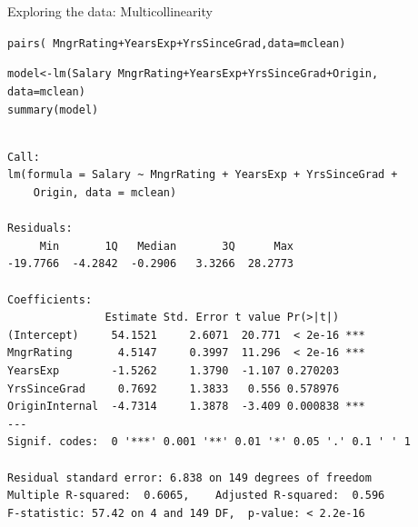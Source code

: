 \documentclass{beamer}\usepackage[]{graphicx}\usepackage[]{color}
\makeatletter
\newcommand{\hlopt}[1]{\textcolor[rgb]{1,0.894,0.769}{#1}}%
\newcommand{\hlstd}[1]{\textcolor[rgb]{1,0.894,0.769}{#1}}%
\newcommand{\hlkwb}[1]{\textcolor[rgb]{0.804,0.776,0.451}{#1}}%
\newcommand{\hlkwc}[1]{\textcolor[rgb]{0.78,0.941,0.545}{#1}}%
\newcommand{\hlkwd}[1]{\textcolor[rgb]{1,0.78,0.769}{#1}}%
\newenvironment{kframe}{%
 \def\at@end@of@kframe{}%
 \ifinner\ifhmode%
  \def\at@end@of@kframe{\end{minipage}}%
  \begin{minipage}{\columnwidth}%
 \fi\fi%
 \def\FrameCommand##1{\hskip\@totalleftmargin \hskip-\fboxsep
 \colorbox{shadecolor}{##1}\hskip-\fboxsep
     \hskip-\linewidth \hskip-\@totalleftmargin \hskip\columnwidth}%
 \MakeFramed {\advance\hsize-\width
   \@totalleftmargin\z@ \linewidth\hsize
   \@setminipage}}%
 {\par\unskip\endMakeFramed%
 \at@end@of@kframe}
\newenvironment{knitrout}{}{} %
\makeatother
\begin{document}
\begin{darkframes}
\begin{frame}[fragile]{Exploring the data: Multicollinearity}
\end{frame}

\begin{frame}[fragile]%
      \fontsize{9}{9}\selectfont
\begin{knitrout}
\begin{kframe}
\begin{alltt}
\hlkwd{pairs}\hlstd{(}\hlopt{~} \hlstd{MngrRating} \hlopt{+} \hlstd{YearsExp} \hlopt{+} \hlstd{YrsSinceGrad,} \hlkwc{data}\hlstd{=mclean)}
\end{alltt}
\end{kframe}


\end{knitrout}
\end{frame}

\begin{frame}[fragile]%
      \fontsize{8}{8}\selectfont
\begin{knitrout}
\begin{kframe}
\begin{alltt}
\hlstd{model} \hlkwb{<-} \hlkwd{lm}\hlstd{(Salary} \hlopt{~} \hlstd{MngrRating} \hlopt{+} \hlstd{YearsExp} \hlopt{+} \hlstd{YrsSinceGrad} \hlopt{+} \hlstd{Origin,}
           \hlkwc{data}\hlstd{=mclean)}
\hlkwd{summary}\hlstd{(model)}
\end{alltt}
\begin{verbatim}

Call:
lm(formula = Salary ~ MngrRating + YearsExp + YrsSinceGrad + 
    Origin, data = mclean)

Residuals:
     Min       1Q   Median       3Q      Max 
-19.7766  -4.2842  -0.2906   3.3266  28.2773 

Coefficients:
               Estimate Std. Error t value Pr(>|t|)    
(Intercept)     54.1521     2.6071  20.771  < 2e-16 ***
MngrRating       4.5147     0.3997  11.296  < 2e-16 ***
YearsExp        -1.5262     1.3790  -1.107 0.270203    
YrsSinceGrad     0.7692     1.3833   0.556 0.578976    
OriginInternal  -4.7314     1.3878  -3.409 0.000838 ***
---
Signif. codes:  0 '***' 0.001 '**' 0.01 '*' 0.05 '.' 0.1 ' ' 1

Residual standard error: 6.838 on 149 degrees of freedom
Multiple R-squared:  0.6065,	Adjusted R-squared:  0.596 
F-statistic: 57.42 on 4 and 149 DF,  p-value: < 2.2e-16
\end{verbatim}
\end{kframe}
\end{knitrout}
\end{frame}







\end{darkframes}
\end{document}
